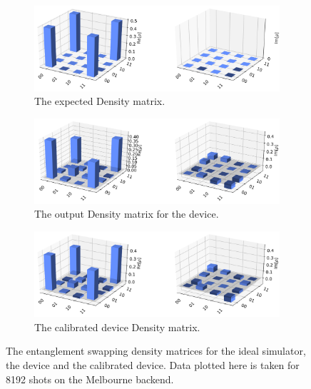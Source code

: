 \begin{figure}[h]
	\begin{subfigure}{.5\textwidth}
    \centering
		\includegraphics[width=.8\linewidth]{images/results/swap_density_sim.png}
		\caption{The expected Density matrix.}
		\label{fig:swap_density_sim}
	\end{subfigure} \newline
	\begin{subfigure}{.5\textwidth}
    \centering
		\includegraphics[width=.8\linewidth]{images/results/swap_density_dev.png}
		\caption{The output Density matrix for the device.}
		\label{fig:swap_density_dev}
	\end{subfigure} \newline
	\begin{subfigure}{.5\textwidth}
    \centering
		\includegraphics[width=.8\linewidth]{images/results/swap_density_cal.png}
		\caption{The calibrated device Density matrix.}
		\label{fig:swap_density_dev}
	\end{subfigure}
	\caption{The entanglement swapping density matrices for the ideal simulator,
    the device and the calibrated device. Data plotted here is taken for 8192 shots
    on the Melbourne backend. }
	\label{fig:swap_density}
\end{figure}


